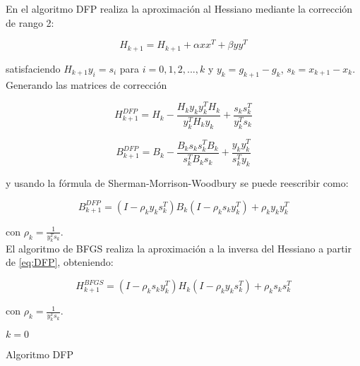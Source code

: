 \documentclass[conference]{IEEEtran}
\begin{document}
En el algoritmo DFP realiza la aproximación al Hessiano mediante la corrección de rango 2:

$$
H_{k+1} = H_{k+1} + \alpha x x^T + \beta y y^T
$$

satisfaciendo $H_{k+1} y_i = s_i$ para $i = 0,1,2,...,k$ y  $y_k = g_{k+1} - g_k$,
$s_k = x_{k+1} - x_k$. Generando las matrices de corrección

\begin{equation}
    H_{k+1}^{DFP} = H_k - \frac{H_k y_k y_k^T H_k}{y_k^T H_k y_k} + \frac{s_k s_k^T}{y_k^T s_k}
    \label{eq:CH}
\end{equation}

\begin{equation}
    B_{k+1}^{DFP} = B_k - \frac{B_k s_k s_k^T B_k}{s_k^T B_k s_k} + \frac{y_k y_k^T}{s_k^T y_k}
    \label{eq:CB}
\end{equation}

y usando la fórmula de Sherman-Morrison-Woodbury se puede reescribir como:

\begin{equation}
    B_{k+1}^{DFP} = (I - \rho_k y_k s_k^T) B_k (I - \rho_k s_k y_k^T) + \rho_k y_k y_k^T
    \label{eq:DFP}
\end{equation}

con $\rho_k = \frac{1}{y_k^T s_k}$. \\

El algoritmo de BFGS realiza la aproximación a la inversa del Hessiano a partir de \eqref{eq:DFP},
obteniendo:

\begin{equation}
    H_{k+1}^{BFGS} = (I - \rho_k s_k y_k^T) H_k (I - \rho_k y_k s_k^T) + \rho_k s_k s_k^T
    \label{eq:BFGS}
\end{equation}

con $\rho_k = \frac{1}{y_k^T s_k}$.

\begin{algorithm}[h]
    \SetAlgoLined
	$k=0$ \\
    \caption{Algoritmo DFP}
    \label{A1}
\end{algorithm}
\end{document}
